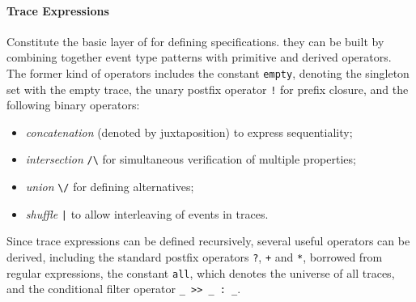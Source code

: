 \paragraph{Trace Expressions}
Constitute the basic layer of \rml for defining specifications.
they can be built by combining together event type patterns with primitive and derived operators.
The former kind of operators includes the constant \lstinline{empty}, denoting the singleton set
with the empty trace, the unary postfix operator \lstinline{!} for prefix closure, and the following binary operators:
\begin{itemize}
	\item \emph{concatenation} (denoted by juxtaposition) to express sequentiality;
	\item \emph{intersection} \lstinline{/\} for simultaneous verification of multiple properties;
	\item \emph{union} \lstinline{\/} for defining alternatives; 
	\item \emph{shuffle} \lstinline{|} to allow interleaving of events in traces. 
\end{itemize}
Since trace expressions can be defined recursively, several useful operators can be derived, including the standard postfix operators
\lstinline{?}, \lstinline{+} and \lstinline{*}, borrowed from regular expressions,  the constant \lstinline{all}, which denotes the universe of all traces,
and the  conditional filter operator \lstinline{_ >> _ : _}.


